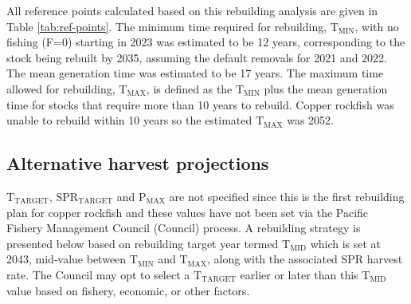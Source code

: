 \documentclass[11pt,
  english,
  a4paper,
]{article}
\begin{document}
\leavevmode\tagmcend\tagstructend\par


All reference points calculated based on this rebuilding analysis are given in Table \ref{tab:ref-points}. The minimum time required for rebuilding, {\(\text{T}_\text{MIN}\)\leavevmode\tagmcend\tagstructend}, with no fishing (F=0) starting in 2023 was estimated to be 12 years, corresponding to the stock being rebuilt by 2035, assuming the default removals for 2021 and 2022. The mean generation time was estimated to be 17 years. The maximum time allowed for rebuilding, {\(\text{T}_\text{MAX}\)\leavevmode\tagmcend\tagstructend}, is defined as the {\(\text{T}_\text{MIN}\)\leavevmode\tagmcend\tagstructend} plus the mean generation time for stocks that require more than 10 years to rebuild. Copper rockfish was unable to rebuild within 10 years so the estimated {\(\text{T}_\text{MAX}\)\leavevmode\tagmcend\tagstructend} was 2052.

\leavevmode\tagmcend\tagstructend\par


\hypertarget{alternative-harvest-projections}{%
\subsection{Alternative harvest projections}\label{alternative-harvest-projections}}

\leavevmode\tagmcend\tagstructend


{\(\text{T}_\text{TARGET}\)\leavevmode\tagmcend\tagstructend}, {\(\text{SPR}_\text{TARGET}\)\leavevmode\tagmcend\tagstructend} and {\(\text{P}_\text{MAX}\)\leavevmode\tagmcend\tagstructend} are not specified since this is the first rebuilding plan for copper rockfish and these values have not been set via the Pacific Fishery Management Council (Council) process. A rebuilding strategy is presented below based on rebuilding target year termed {\(\text{T}_\text{MID}\)\leavevmode\tagmcend\tagstructend} which is set at 2043, mid-value between {\(\text{T}_\text{MIN}\)\leavevmode\tagmcend\tagstructend} and {\(\text{T}_\text{MAX}\)\leavevmode\tagmcend\tagstructend}, along with the associated SPR harvest rate. The Council may opt to select a {\(\text{T}_\text{TARGET}\)\leavevmode\tagmcend\tagstructend} earlier or later than this {\(\text{T}_\text{MID}\)\leavevmode\tagmcend\tagstructend} value based on fishery, economic, or other factors.
\end{document}
